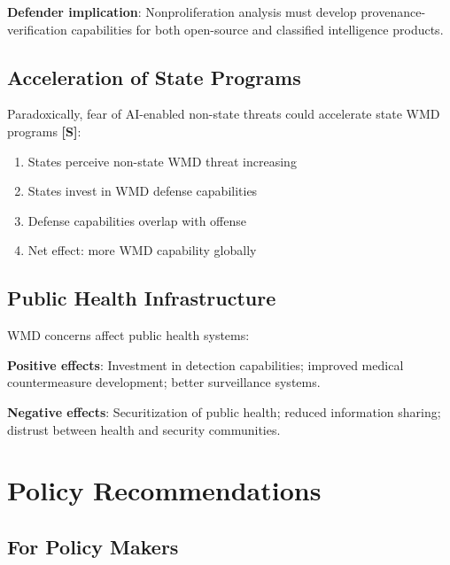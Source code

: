 \documentclass[11pt,letterpaper]{article}
\begin{document}
\textbf{Defender implication}: Nonproliferation analysis must develop provenance-verification capabilities for both open-source and classified intelligence products.

\subsection{Acceleration of State Programs}

Paradoxically, fear of AI-enabled non-state threats could accelerate state WMD programs \textbf{[S]}:
\begin{enumerate}
  \item States perceive non-state WMD threat increasing
  \item States invest in WMD defense capabilities
  \item Defense capabilities overlap with offense
  \item Net effect: more WMD capability globally
\end{enumerate}

\subsection{Public Health Infrastructure}

WMD concerns affect public health systems:

\textbf{Positive effects}: Investment in detection capabilities; improved medical countermeasure development; better surveillance systems.

\textbf{Negative effects}: Securitization of public health; reduced information sharing; distrust between health and security communities.

\clearpage
\section{Policy Recommendations}

\subsection{For Policy Makers}
\end{document}
